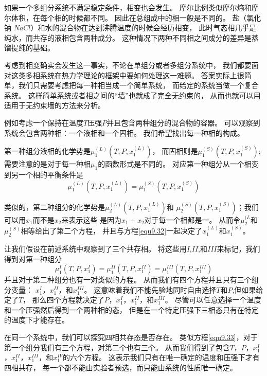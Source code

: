 如果一个多组分系统不满足稳定条件，相变也会发生。
摩尔比例类似摩尔熵和摩尔体积，在每个相的时候都不同。
因此在总组成中的相一般是不同的。
盐（氯化钠 $NaCl$）和水的混合物在达到沸腾温度的时候会经历相变，
此时气态相几乎是纯水，而共存的液相包含两种成分。
这种情况下两种不同相之间成分的差异是蒸馏提纯的基础。

考虑到相变确实会发生这一事实，不论在单组分或者多组分系统中，
我们都要面对这类多相系统在热力学理论的框架中要如何处理这一难题。
答案实际上很简单，我们只需要考虑把每一种相当成一个简单系统，
而给定的系统当做一个复合系统。
这样简单系统或者相之间的“墙”也就成了完全无约束的，
从而也就可以用适用于无约束墙的方法来分析。

例如考虑一个保持在温度$T$压强$P$并且包含两种组分的混合物的容器。
可以观察到系统会包含两种相：一个液相和一个固相。
我们希望找出每一种相的构成。

第一种组分液相的化学势是$\mu_1^{(L)}(T,P,x_1^{(L)})$，
而固相则是$\mu_1^{(S)}(T,P,x_1^{(S)})$;
需要注意的是对于每一种相$\mu_1$的函数形式是不同的。
对应第一种组分从一个相变到另一个相的平衡条件是
\begin{equation}
\label{equ9.32}
\mu_1^{(L)}(T,P,x_1^{(L)})=\mu_1^{(S)}(T,P,x_1^{(S)})
\end{equation}

类似的，第二种组分的化学势是$\mu_2^{(L)}(T,P,x_1^{(L)})$和
$\mu_2^{(S)}(T,P,x_1^{(S)})$；我们可以用$x_1$而不是$x_2$来表示这些
是因为$x_1+x_2$对于每一个相都是一。
从而令$\mu_2^{(L}$和$\mu_2^{(S)}$相等给出了第二个方程，
并且与方程\eqref{equ9.32}一起决定了$x_1^{(L)}$和$x_1^{(S)}$。

让我们假设在前述系统中观察到了三个共存相。
将这些用$I$,$II$,和$III$来标记，我们得到对第一种组分
\begin{equation}
\label{equ9.33}
\mu_1^{I}(T,P,x_1^{I})=\mu_1^{II}(T,P,x_1^{II})=\mu_1^{III}(T,P,x_1^{III})
\end{equation}
并且对于第二种组分也有一对类似的方程。
从而我们有四个方程并且只有三个组分变量：
$x_1^I$，$x_1^{II}$，和$x_1^{III}$。
这意味着我们不能先验地同时自由选择$T$和$P$,但如果给定了$T$，
那么四个方程就决定了$P$，$x_1^I$，$x_1^{II}$，和$x_1^{III}$。
尽管可以任意选择一个温度和一个压强然后得到一个两种相的态，
但是在一个特定压强下三相态只有在特定的温度下才能存在。

在同一个系统中，我们可以探究四相共存态是否存在。
类似方程\eqref{equ9.33}，对于第一个组分我们有三个方程，对第二个也有三个。
从而我们得到了包含$T$，$P$，$x_1^I$，$x_1^{II}$，$x_1^{III}$，和$x_1^{IV}$的六个方程。
这表示我们只有在唯一确定的温度和压强下才有四相共存，
每一个都不能由实验者预选，而只能由系统的性质唯一确定。

